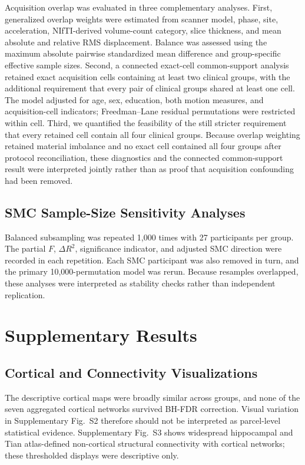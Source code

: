 \documentclass{article}
\begin{document}
Acquisition overlap was evaluated in three complementary analyses. First, generalized overlap weights were estimated from scanner model, phase, site, acceleration, NIfTI-derived volume-count category, slice thickness, and mean absolute and relative RMS displacement. Balance was assessed using the maximum absolute pairwise standardized mean difference and group-specific effective sample sizes. Second, a connected exact-cell common-support analysis retained exact acquisition cells containing at least two clinical groups, with the additional requirement that every pair of clinical groups shared at least one cell. The model adjusted for age, sex, education, both motion measures, and acquisition-cell indicators; Freedman--Lane residual permutations were restricted within cell. Third, we quantified the feasibility of the still stricter requirement that every retained cell contain all four clinical groups. Because overlap weighting retained material imbalance and no exact cell contained all four groups after protocol reconciliation, these diagnostics and the connected common-support result were interpreted jointly rather than as proof that acquisition confounding had been removed.

\subsection{SMC Sample-Size Sensitivity Analyses}
Balanced subsampling was repeated 1,000 times with 27 participants per group. The partial \(F\), \(\Delta R^2\), significance indicator, and adjusted SMC direction were recorded in each repetition. Each SMC participant was also removed in turn, and the primary 10,000-permutation model was rerun. Because resamples overlapped, these analyses were interpreted as stability checks rather than independent replication.

\section{Supplementary Results}

\subsection{Cortical and Connectivity Visualizations}
The descriptive cortical maps were broadly similar across groups, and none of the seven aggregated cortical networks survived BH-FDR correction. Visual variation in Supplementary Fig.~S2 therefore should not be interpreted as parcel-level statistical evidence. Supplementary Fig.~S3 shows widespread hippocampal and Tian atlas-defined non-cortical structural connectivity with cortical networks; these thresholded displays were descriptive only.
\end{document}
